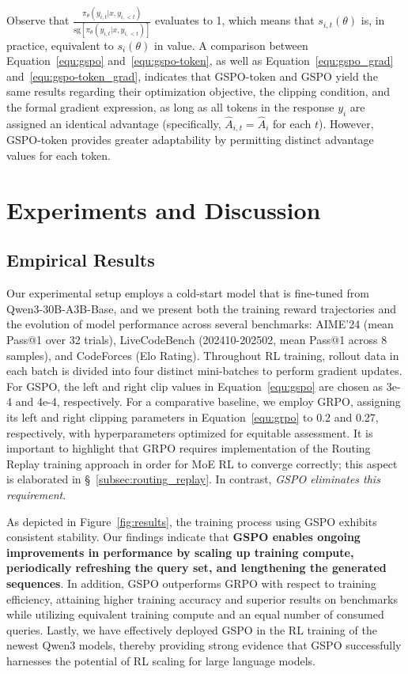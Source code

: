 Observe that $\frac{ \pi_{\theta} (y_{i,t} | x, y_{i,<t}) }{ \mathrm{sg} \left[ \pi_{\theta} (y_{i,t} | x, y_{i,<t}) \right] }$ evaluates to 1, which means that $s_{i,t}(\theta)$ is, in practice, equivalent to $s_{i}(\theta)$ in value. A comparison between Equation~\eqref{equ:gspo} and~\eqref{equ:gspo-token}, as well as Equation~\eqref{equ:gspo_grad} and~\eqref{equ:gspo-token_grad}, indicates that GSPO-token and GSPO yield the same results regarding their optimization objective, the clipping condition, and the formal gradient expression, as long as all tokens in the response $y_i$ are assigned an identical advantage (specifically, $\widehat{A}_{i,t} = \widehat{A}_{i}$ for each $t$). However, GSPO-token provides greater adaptability by permitting distinct advantage values for each token.

\section{Experiments and Discussion}

\subsection{Empirical Results}

Our experimental setup employs a cold-start model that is fine-tuned from Qwen3-30B-A3B-Base, and we present both the training reward trajectories and the evolution of model performance across several benchmarks: AIME'24 (mean Pass@1 over 32 trials), LiveCodeBench (202410-202502, mean Pass@1 across 8 samples), and CodeForces (Elo Rating). Throughout RL training, rollout data in each batch is divided into four distinct mini-batches to perform gradient updates. For GSPO, the left and right clip values in Equation~\eqref{equ:gspo} are chosen as 3e-4 and 4e-4, respectively. For a comparative baseline, we employ GRPO, assigning its left and right clipping parameters in Equation~\eqref{equ:grpo} to 0.2 and 0.27, respectively, with hyperparameters optimized for equitable assessment. It is important to highlight that GRPO requires implementation of the Routing Replay training approach in order for MoE RL to converge correctly; this aspect is elaborated in \S~\ref{subsec:routing_replay}. In contrast, \textit{GSPO eliminates this requirement}.

As depicted in Figure~\ref{fig:results}, the training process using GSPO exhibits consistent stability. Our findings indicate that \textbf{GSPO enables ongoing improvements in performance by scaling up training compute, periodically refreshing the query set, and lengthening the generated sequences}. In addition, GSPO outperforms GRPO with respect to training efficiency, attaining higher training accuracy and superior results on benchmarks while utilizing equivalent training compute and an equal number of consumed queries. Lastly, we have effectively deployed GSPO in the RL training of the newest Qwen3 models, thereby providing strong evidence that GSPO successfully harnesses the potential of RL scaling for large language models.

